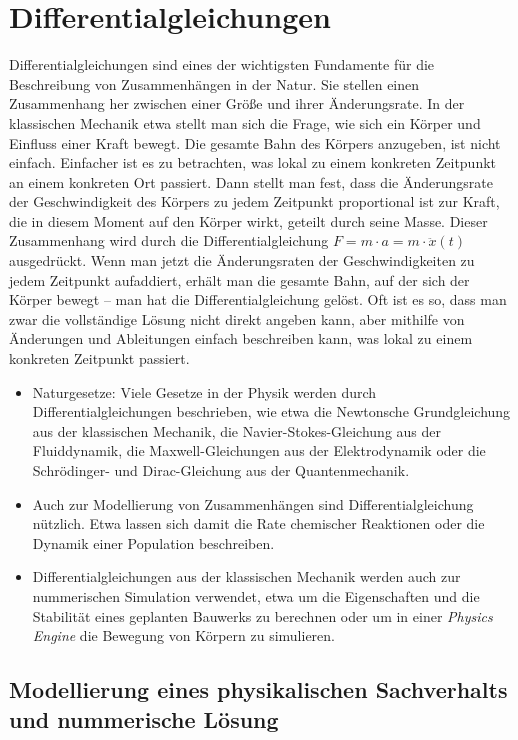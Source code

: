 \chapter{Differentialgleichungen}

Differentialgleichungen sind eines der wichtigsten Fundamente für die Beschreibung von Zusammenhängen in der Natur. Sie stellen einen Zusammenhang her zwischen einer Größe und ihrer Änderungsrate. In der klassischen Mechanik etwa stellt man sich die Frage, wie sich ein Körper und Einfluss einer Kraft bewegt. Die gesamte Bahn des Körpers anzugeben, ist nicht einfach. Einfacher ist es zu betrachten, was lokal zu einem konkreten Zeitpunkt an einem konkreten Ort passiert. Dann stellt man fest, dass die Änderungsrate der Geschwindigkeit des Körpers zu jedem Zeitpunkt proportional ist zur Kraft, die in diesem Moment auf den Körper wirkt, geteilt durch seine Masse. Dieser Zusammenhang wird durch die Differentialgleichung $F=m\cdot a = m \cdot \ddot{x}(t)$ ausgedrückt. Wenn man jetzt die Änderungsraten der Geschwindigkeiten zu jedem Zeitpunkt aufaddiert, erhält man die gesamte Bahn, auf der sich der Körper bewegt -- man hat die Differentialgleichung gelöst. Oft ist es so, dass man zwar die vollständige Lösung nicht direkt angeben kann, aber mithilfe von Änderungen und Ableitungen einfach beschreiben kann, was lokal zu einem konkreten Zeitpunkt passiert.

\begin{itemize}
    \item Naturgesetze: Viele Gesetze in der Physik werden durch Differentialgleichungen beschrieben, wie etwa die Newtonsche Grundgleichung aus der klassischen Mechanik, die Navier-Stokes-Gleichung aus der Fluiddynamik, die Maxwell-Gleichungen aus der Elektrodynamik oder die Schrödinger- und Dirac-Gleichung aus der Quantenmechanik.
    \item Auch zur Modellierung von Zusammenhängen sind Differentialgleichung nützlich. Etwa lassen sich damit die Rate chemischer Reaktionen oder die Dynamik einer Population beschreiben.
    \item Differentialgleichungen aus der klassischen Mechanik werden auch zur nummerischen Simulation verwendet, etwa um die Eigenschaften und die Stabilität eines geplanten Bauwerks zu berechnen oder um in einer \emph{Physics Engine} die Bewegung von Körpern zu simulieren.
\end{itemize}

\section{Modellierung eines physikalischen Sachverhalts und nummerische Lösung}


